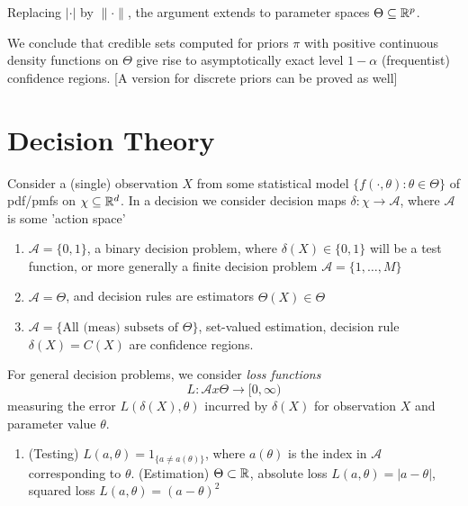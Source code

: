 \documentclass[a4paper]{article}
\begin{document}
Replacing $|\cdot |$ by $\|\cdot \|$, the argument extends to parameter spaces $\Theta \subseteq \mathbb{R}^{p}$.

We conclude that credible sets computed for priors $\pi$ with positive continuous density functions on $\Theta$ give rise to asymptotically exact level $1- \alpha$ (frequentist) confidence regions. [A version for discrete priors can be proved as well]

\section{Decision Theory}

Consider a (single) observation $X$ from some statistical model $\{f\left( \cdot , \theta \right) : \theta \in \Theta \}$ of pdf/pmfs on $\chi \subseteq \mathbb{R}^{d}$. In a decision we consider decision maps $\delta : \chi \to \mathcal{A}$, where $\mathcal{A}$ is some 'action space'

\begin{eg}
	\begin{enumerate}[label=\roman*)]
		\item $\mathcal{A} = \{0,1\} $, a binary decision problem, where $\delta(X) \in \{0,1\} $ will be a test function, or more generally a finite decision problem $\mathcal{A} = \{1,\ldots,M\} $
		\item $\mathcal{A} = \Theta$, and decision rules are estimators $\hat{\Theta}(X) \in  \Theta$
		\item $\mathcal{A} = \{ \text{All (meas) subsets of } \Theta\} $, set-valued estimation, decision rule $\delta(X) = C(X)$ are confidence regions.
	\end{enumerate}
\end{eg}

For general decision problems, we consider \textit{loss functions}
\[
	L: \mathcal{A} x \Theta \to [0, \infty)
\] 
measuring the error $L(\delta(X), \theta)$ incurred by  $\delta(X)$ for observation $X$ and parameter value $\theta$.

\begin{eg}
	\begin{enumerate}[label=\roman*)]
		\item (Testing) $L(a,\theta) = 1_{\{a \neq  a(\theta)\} }$, where $a(\theta)$ is the index in $\mathcal{A}$ corresponding to $\theta$.
		\itemi (Estimation) $\Theta \subset \mathbb{R}$, absolute loss $L(a,\theta) = |a-\theta|$, squared loss $L(a,\theta) = (a-\theta)^2$
	\end{enumerate}
\end{eg}
\end{document}
